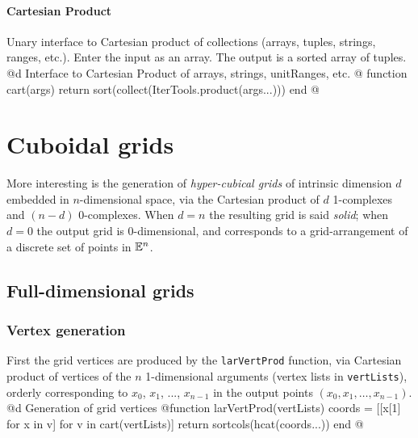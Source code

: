 \paragraph{Cartesian Product}
Unary interface to Cartesian product of collections (arrays, tuples, strings, ranges, etc.).
Enter the input as an array. The output is a sorted array of tuples.
@d Interface to Cartesian Product of arrays, strings, unitRanges, etc.
@{
function cart(args)
	return sort(collect(IterTools.product(args...)))
end
@}



\section{Cuboidal grids}\label{sec:cuboids}

More interesting is the generation of \emph{hyper-cubical grids} of intrinsic dimension $d$ embedded in $n$-dimensional space, via the Cartesian product of $d$ 1-complexes and $(n-d)$ 0-complexes. When $d=n$ the resulting grid is said \emph{solid}; when $d=0$ the output grid is 0-dimensional, and corresponds to a grid-arrangement of a discrete set of points in $\mathbb{E}^n$.


\subsection{Full-dimensional grids}

\subsubsection{Vertex generation}

First the grid vertices are produced by the \texttt{larVertProd} function, via Cartesian product of vertices of the $n$ 1-dimensional arguments (vertex lists in \texttt{vertLists}), orderly corresponding to $x_0$, $x_1$, ..., $x_{n-1}$ in the output points $(x_0, x_1,\ldots,x_{n-1})$.
@d Generation of grid vertices 
@{function larVertProd(vertLists)
	coords = [[x[1] for x in v] for v in cart(vertLists)]
   return sortcols(hcat(coords...))
end
@}




